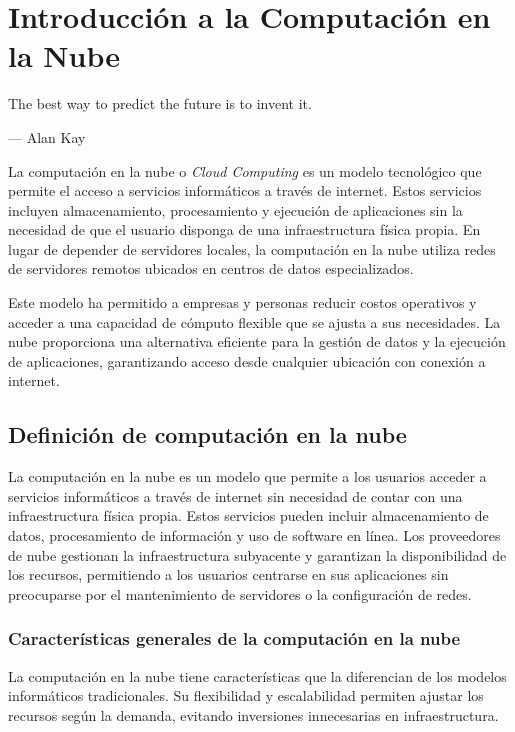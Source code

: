 {\justifying
	\chapter[Introducci{\'o}n de Cloud Computing]{Introducci{\'o}n a la Computaci{\'o}n en la Nube}
	\epigraph{The best way to predict the future is to invent it.}
        {--- \textup{Alan Kay}}
        
    La computaci{\'o}n en la nube o \textit{Cloud Computing} es un modelo tecnol{\'o}gico que permite el acceso a servicios inform{\'a}ticos a trav{\'e}s de internet. Estos servicios incluyen almacenamiento, procesamiento y ejecuci{\'o}n de aplicaciones sin la necesidad de que el usuario disponga de una infraestructura f{\'i}sica propia. En lugar de depender de servidores locales, la computaci{\'o}n en la nube utiliza redes de servidores remotos ubicados en centros de datos especializados.
    
    Este modelo ha permitido a empresas y personas reducir costos operativos y acceder a una capacidad de c{\'o}mputo flexible que se ajusta a sus necesidades. La nube proporciona una alternativa eficiente para la gesti{\'o}n de datos y la ejecuci{\'o}n de aplicaciones, garantizando acceso desde cualquier ubicaci{\'o}n con conexi{\'o}n a internet.

    \section{Definici{\'o}n de computaci{\'o}n en la nube}
        La computaci{\'o}n en la nube es un modelo que permite a los usuarios acceder a servicios inform{\'a}ticos a trav{\'e}s de internet sin necesidad de contar con una infraestructura f{\'i}sica propia. Estos servicios pueden incluir almacenamiento de datos, procesamiento de informaci{\'o}n y uso de software en l{\'i}nea. Los proveedores de nube gestionan la infraestructura subyacente y garantizan la disponibilidad de los recursos, permitiendo a los usuarios centrarse en sus aplicaciones sin preocuparse por el mantenimiento de servidores o la configuraci{\'o}n de redes.
        \subsection{Caracter{\'i}sticas generales de la computaci{\'o}n en la nube}
            La computaci{\'o}n en la nube tiene caracter{\'i}sticas que la diferencian de los modelos inform{\'a}ticos tradicionales. Su flexibilidad y escalabilidad permiten ajustar los recursos seg{\'u}n la demanda, evitando inversiones innecesarias en infraestructura.
            
}
